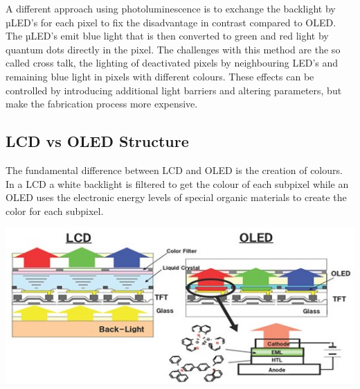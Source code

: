 \documentclass[11pt,a4paper]{article} %
\begin{document}
\begin{multicols}{2}
    A different approach using photoluminescence is to exchange the backlight
    by µLED’s for each pixel to fix the disadvantage in contrast compared to OLED.
    The µLED’s emit blue light that is then converted to green and red light by
    quantum dots directly in the pixel. The challenges with this method are the so
    called cross talk, the lighting of deactivated pixels by neighbouring LED’s and
    remaining blue light in pixels with different colours. These effects can be
    controlled by introducing additional light barriers and altering parameters,
    but make the fabrication process more expensive.

\end{multicols}

\begin{tcolorbox}[colback=red!5!white,colframe=red!75!black]
    \begin{minipage}{0.45\textwidth}
        \subsection*{LCD vs OLED Structure}
        The fundamental difference between LCD and OLED is the creation of colours.
        In a LCD a white backlight is filtered to get the colour of each subpixel 
        while an OLED uses the electronic energy levels of special organic materials
        to create the color for each subpixel.
    \end{minipage}
    \hspace{15pt}
    \begin{minipage}{0.45\textwidth}
    \begin{center}
        \vspace{10pt}
        \includegraphics[width=\linewidth]{OldConcepts.jpg}
        \label{fig:CIEchrom}
        \vspace{10pt}
    \end{center}
\end{minipage}
\end{tcolorbox}
\end{document}
